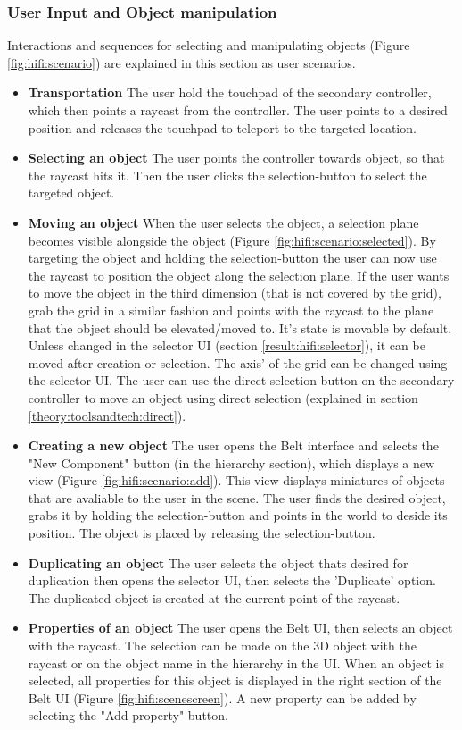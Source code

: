 \subsubsection{User Input and Object manipulation}
Interactions and sequences for selecting and manipulating objects (Figure \ref{fig:hifi:scenario}) are explained in this section as user scenarios.
\begin{itemize}
  \item \textbf{Transportation} The user hold the touchpad of the secondary controller, which then points a raycast from the controller. The user points to a desired position and releases the touchpad to teleport to the targeted location.
  \item \textbf{Selecting an object} The user points the controller towards object, so that the raycast hits it. Then the user clicks the selection-button to select the targeted object.
  \item \textbf{Moving an object} When the user selects the object,  a selection plane becomes visible alongside the object (Figure \ref{fig:hifi:scenario:selected}). By targeting the object and holding the selection-button the user can now use the raycast to position the object along the selection plane. If the user wants to move the object in the third dimension (that is not covered by the grid), grab the grid in a similar fashion and points with the raycast to the plane that the object should be elevated/moved to. It's state is movable by default. Unless changed in the selector UI (section \ref{result:hifi:selector}), it can be moved after creation or selection. The axis' of the grid can be changed using the selector UI. The user can use the direct selection button on the secondary controller to move an object using direct selection (explained in section \ref{theory:toolsandtech:direct}).
  \item \textbf{Creating a new object} The user opens the Belt interface and selects the "New Component" button (in the hierarchy section), which displays a new view (Figure \ref{fig:hifi:scenario:add}). This view displays miniatures of objects that are avaliable to the user in the scene. The user finds the desired object, grabs it by holding the selection-button and points in the world to deside its position. The object is placed by releasing the selection-button.
  \item \textbf{Duplicating an object} The user selects the object thats desired for duplication then opens the selector UI, then selects the 'Duplicate' option. The duplicated object is created at the current point of the raycast.
  \item \textbf{Properties of an object} The user opens the Belt UI, then selects an object with the raycast. The selection can be made on the 3D object with the raycast or on the object name in the hierarchy in the UI. When an object is selected, all properties for this object is displayed in the right section of the Belt UI (Figure \ref{fig:hifi:scenescreen}). A new property can be added by selecting the "Add property" button.
\end{itemize}

